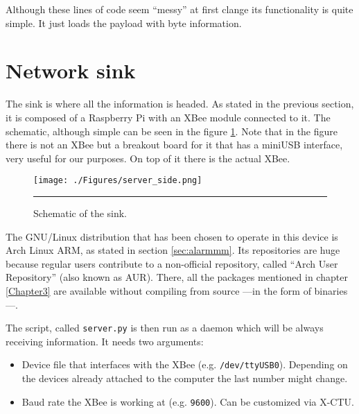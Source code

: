 Although these lines of code seem ``messy'' at first clange its functionality is quite simple. It just loads the payload with byte information.



\section{Network sink}

The sink is where all the information is headed. As stated in the previous section, it is composed of a Raspberry Pi with an XBee module connected to it. The schematic, although simple can be seen in the figure \ref{fig:sinkrpi}. Note that in the figure there is not an XBee but a breakout board for it that has a miniUSB interface, very useful for our purposes. On top of it there is the actual XBee\textregistered{}.

\begin{figure}[htbp]
    \centering
        \texttt{[image: ./Figures/server\_side.png]}
        \rule{35em}{0.5pt}
    \caption[Raspberry Pi based sink]{Schematic of the sink.}
    \label{fig:sinkrpi}
\end{figure}

The GNU/Linux distribution that has been chosen to operate in this device is Arch Linux ARM, as stated in section \ref{sec:alarmmm}. Its repositories are huge because regular users contribute to a non-official repository, called ``Arch User Repository'' (also known as AUR). There, all the packages mentioned in chapter \ref{Chapter3} are available without compiling from source ---in the form of binaries---.

The script, called \texttt{server.py} is then run as a daemon which will be always receiving information. It needs two arguments:

\begin{itemize}
    \item Device file that interfaces with the XBee\textregistered{} (e.g. \texttt{/dev/ttyUSB0}). Depending on the devices already attached to the computer the last number might change.
    \item Baud rate the XBee\textregistered{} is working at (e.g. \texttt{9600}). Can be customized via X-CTU.
\end{itemize}

